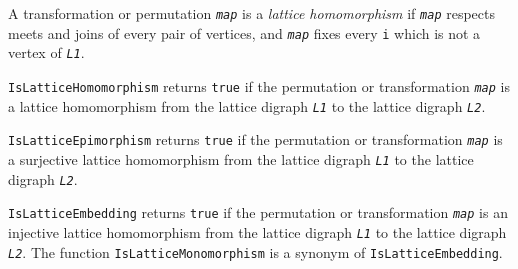 \documentclass[a4paper,11pt]{report}
\begin{document}
{{{ A transformation or permutation \mbox{\texttt{\mdseries\slshape map}} is a \emph{lattice homomorphism} if \mbox{\texttt{\mdseries\slshape map}} respects meets and joins of every pair of vertices, and \mbox{\texttt{\mdseries\slshape map}} fixes every \texttt{i} which is not a vertex of \mbox{\texttt{\mdseries\slshape L1}}. 

 \texttt{IsLatticeHomomorphism} returns \texttt{true} if the permutation or transformation \mbox{\texttt{\mdseries\slshape map}} is a lattice homomorphism from the lattice digraph \mbox{\texttt{\mdseries\slshape L1}} to the lattice digraph \mbox{\texttt{\mdseries\slshape L2}}. 

 \texttt{IsLatticeEpimorphism} returns \texttt{true} if the permutation or transformation \mbox{\texttt{\mdseries\slshape map}} is a surjective lattice homomorphism from the lattice digraph \mbox{\texttt{\mdseries\slshape L1}} to the lattice digraph \mbox{\texttt{\mdseries\slshape L2}}. 

 \texttt{IsLatticeEmbedding} returns \texttt{true} if the permutation or transformation \mbox{\texttt{\mdseries\slshape map}} is an injective lattice homomorphism from the lattice digraph \mbox{\texttt{\mdseries\slshape L1}} to the lattice digraph \mbox{\texttt{\mdseries\slshape L2}}. The function \texttt{IsLatticeMonomorphism} is a synonym of \texttt{IsLatticeEmbedding}. 

}}}
\end{document}
